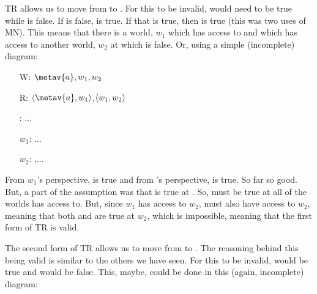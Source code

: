 TR allows us to move from \ebox{} to \ebox\ebox{}. For this to be invalid, \ebox{} would need to be true while \ebox\ebox{} is false. If \ebox\ebox{} is false, \enot\ebox\ebox{} is true. If that is true, then \ediamond\ediamond\enot{} is true (this was two uses of MN). This means that there is a world, $w_1$ which  has access to and which has access to another world, $w_2$ at which  is false. Or, using a simple (incomplete) diagram:

\begin{center}
\end{center}
\begin{itemize}
\item[W:] $\metav{a},w_1,w_2$
\item[R:]$\openntuple \metav{a},w_1\closentuple$,$\langle w_1,w_2\rangle$  
\item[\metav{a}:] ... 
\item[$w_1$:] ...
\item[$w_2$:] \enot{},...
\end{itemize}

From $w_1$'s perspective, \ediamond\enot{} is true and from 's perspective, \ediamond\ediamond\enot{} is true. So far so good. But, a part of the assumption was that \ebox{} is true at . So,  must be true at all of the worlds  has access to. But, since $w_1$ has access to $w_2$,  must also have access to $w_2$, meaning that both \enot{} and  are true at $w_2$, which is impossible, meaning that the first form of TR is valid. 

The second form of TR allows us to move from \ediamond\ediamond{} to \ediamond{}. The reasoning behind this being valid is similar to the others we have seen. For this to be invalid, \ediamond\ediamond{} would be true and \ediamond{} would be false. This, maybe, could be done in this (again, incomplete) diagram:

